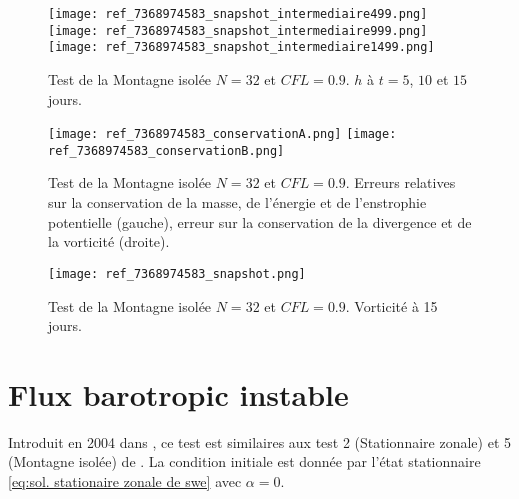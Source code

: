 \begin{figure}[ht]
\begin{center}
\texttt{[image: ref\_7368974583\_snapshot\_intermediaire499.png]}\\
\texttt{[image: ref\_7368974583\_snapshot\_intermediaire999.png]}\\
\texttt{[image: ref\_7368974583\_snapshot\_intermediaire1499.png]}
\end{center}
\caption{Test de la Montagne isolée \cite{Williamson1992} $N=32$ et $CFL=0.9$. $h$ à $t=5$, $10$ et $15$ jours.}
\label{fig: williamson 5 space height}
\end{figure}

\begin{figure}[ht]
\begin{center}
\texttt{[image: ref\_7368974583\_conservationA.png]}
\texttt{[image: ref\_7368974583\_conservationB.png]}
\end{center}
\caption{Test de la Montagne isolée \cite{Williamson1992} $N=32$ et $CFL=0.9$. Erreurs relatives sur la conservation de la masse, de l'énergie et de l'enstrophie potentielle (gauche), erreur sur la conservation de la divergence et de la vorticité (droite).}
\label{fig: williamson 5 conservation}
\end{figure}

\begin{figure}[ht]
\begin{center}
\texttt{[image: ref\_7368974583\_snapshot.png]}
\end{center}
\caption{Test de la Montagne isolée \cite{Williamson1992} $N=32$ et $CFL=0.9$. Vorticité à 15 jours.}
\label{fig: williamson 5 vorticité}
\end{figure}



















\newpage
\section{Flux barotropic instable}

Introduit en 2004 dans \cite{Galewsky2004}, ce test est similaires aux test 2 (Stationnaire zonale) et 5 (Montagne isolée) de \cite{Williamson1992}. La condition initiale est donnée par l'état stationnaire \eqref{eq:sol. stationaire zonale de swe} avec $\alpha=0$.

